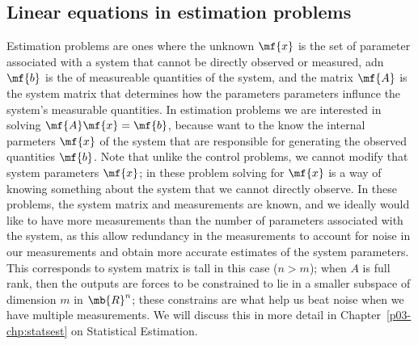 \subsection{Linear equations in estimation problems}
Estimation problems are ones where the unknown $\mf{x}$ is the set of parameter associated with a system that cannot be directly observed or measured, adn $\mf{b}$ is the of measureable quantities of the system, and the matrix $\mf{A}$ is the system matrix that determines how the parameters parameters influnce the system's measurable quantities. In estimation problems we are interested in solving $\mf{A}\mf{x} = \mf{b}$, because want to the know the internal parmeters $\mf{x}$ of the system that are responsible for generating the observed quantities $\mf{b}$. Note that unlike the control problems, we cannot modify that system parameters $\mf{x}$; in these problem solving for $\mf{x}$ is a way of knowing something about the system that we cannot directly observe. In these problems, the system matrix and measurements are known, and we ideally would like to have more measurements than the number of parameters associated with the system, as this allow redundancy in the measurements to account for noise in our measurements and obtain more accurate estimates of the system parameters. This corresponds to system matrix is tall in this case ($n > m$); when $A$ is full rank, then the outputs are forces to be constrained to lie in a smaller subspace of dimension $m$ in $\mb{R}^n$; these constrains are what help us beat noise when we have multiple measurements. We will discuss this in more detail in Chapter~\ref{p03-chp:statsest} on Statistical Estimation.

